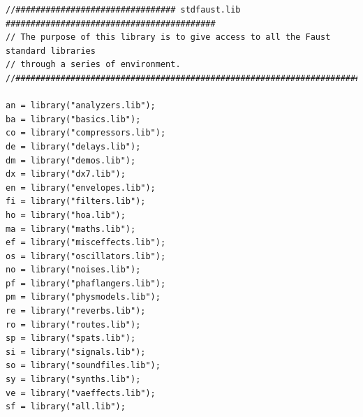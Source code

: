 \documentclass{article}
\begin{document}
\bigskip\bigskip
\begin{lstlisting}[caption=\texttt{stdfaust.lib}]
//################################ stdfaust.lib ##########################################
// The purpose of this library is to give access to all the Faust standard libraries
// through a series of environment.
//########################################################################################

an = library("analyzers.lib");
ba = library("basics.lib");
co = library("compressors.lib");
de = library("delays.lib");
dm = library("demos.lib");
dx = library("dx7.lib");
en = library("envelopes.lib");
fi = library("filters.lib");
ho = library("hoa.lib");
ma = library("maths.lib");
ef = library("misceffects.lib");
os = library("oscillators.lib");
no = library("noises.lib");
pf = library("phaflangers.lib");
pm = library("physmodels.lib");
re = library("reverbs.lib");
ro = library("routes.lib");
sp = library("spats.lib");
si = library("signals.lib");
so = library("soundfiles.lib");
sy = library("synths.lib");
ve = library("vaeffects.lib");
sf = library("all.lib");
\end{lstlisting}
\end{document}

